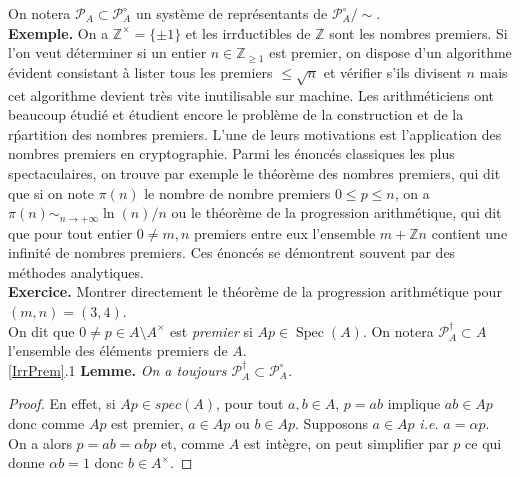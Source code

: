 \documentclass[a4paper, oneside, 12pt]{book}
\theoremstyle{theoremeStyle} %
\theoremstyle{definition} %
\newcommand{\ie}{\textit{i.e.}} %
\DeclareMathOperator{\Spec}{Spec}
\newcommand{\Z}{\mathbb{Z}}
\begin{document}
   On notera $\mathcal{P}_A\subset \mathcal{P}_A^\circ$ un système de représentants de $\mathcal{P}_A^\circ/\sim$.\\



  \textbf{Exemple.} On a $\Z^\times=\lbrace \pm 1\rbrace$ et les irr\'ductibles de $\Z$ sont les nombres premiers. Si l'on veut déterminer si un entier $n\in\Z_{\geq 1}$ est premier, on dispose d'un algorithme évident consistant à lister tous les premiers $\leq \sqrt{n}$ et vérifier s'ils divisent $n$ mais cet algorithme devient très vite inutilisable sur machine. Les arithméticiens ont beaucoup étudié et étudient encore  le problème de la construction et de la r\'partition des nombres premiers.  L'une de leurs motivations  est l'application des nombres premiers en cryptographie. Parmi les énoncés classiques  les plus spectaculaires, on trouve par exemple le théorème des nombres premiers, qui dit que si on note $\pi(n)$ le nombre de nombre premiers $0\leq  p\leq n$, on a $\pi(n)\sim_{n\to+\infty} \ln(n)/n$ ou le théorème de   la progression arithmétique, qui dit que pour tout entier $0\not= m,n$ premiers entre eux l'ensemble $m+\Z n$ contient une infinité de nombres premiers. Ces énoncés se démontrent souvent par des méthodes analytiques. \\

   \textbf{Exercice.}  Montrer directement le  théorème de   la progression arithmétique pour $(m,n)=(3,4)$.\\



   On dit que $0\not=p\in A\setminus A^\times$  est \textit{premier} si   $Ap\in \Spec(A)$. On notera $\mathcal{P}^\dag_A\subset A$ l'ensemble des éléments premiers de $A$. \\



\ref{IrrPrem}.1 \textbf{Lemme.} \textit{On a toujours $\mathcal{P}_A^\dag\subset \mathcal{P}_A^\circ$.}
  \begin{proof} En effet, si $Ap\in spec(A)$, pour tout $a,b\in A$, $p=ab$ implique $ab\in Ap$ donc comme $Ap$ est premier, $a\in Ap$ ou $b\in Ap$. Supposons $a\in Ap$ \ie{} $a=\alpha p$. On a alors $p=ab=\alpha bp$  et, comme $A$ est intègre, on peut simplifier par $p$ ce qui donne $\alpha b=1$ donc $b\in A^\times$.\end{proof}
\end{document}
